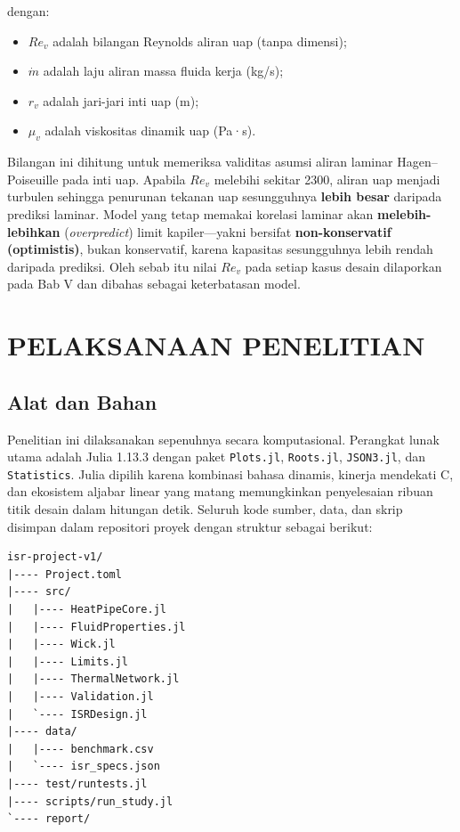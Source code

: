 \documentclass[
  indonesian,
  12pt,
  a4paper,
]{report}
\providecommand{\tightlist}{%
  \setlength{\itemsep}{0pt}\setlength{\parskip}{0pt}}
\begin{document}
dengan:

\begin{itemize}
\tightlist
\item
  \(Re_v\) adalah bilangan Reynolds aliran uap (tanpa dimensi);
\item
  \(\dot{m}\) adalah laju aliran massa fluida kerja (kg/s);
\item
  \(r_v\) adalah jari-jari inti uap (m);
\item
  \(\mu_v\) adalah viskositas dinamik uap (Pa·s).
\end{itemize}

Bilangan ini dihitung untuk memeriksa validitas asumsi aliran laminar
Hagen--Poiseuille pada inti uap. Apabila \(Re_v\) melebihi sekitar 2300,
aliran uap menjadi turbulen sehingga penurunan tekanan uap sesungguhnya
\textbf{lebih besar} daripada prediksi laminar. Model yang tetap memakai
korelasi laminar akan \textbf{melebih-lebihkan} (\emph{overpredict})
limit kapiler---yakni bersifat \textbf{non-konservatif (optimistis)},
bukan konservatif, karena kapasitas sesungguhnya lebih rendah daripada
prediksi. Oleh sebab itu nilai \(Re_v\) pada setiap kasus desain
dilaporkan pada Bab V dan dibahas sebagai keterbatasan model.

\chapter{PELAKSANAAN PENELITIAN}\label{sec-research-methodology}

\section{Alat dan Bahan}\label{alat-dan-bahan}

Penelitian ini dilaksanakan sepenuhnya secara komputasional. Perangkat
lunak utama adalah Julia 1.13.3 dengan paket \texttt{Plots.jl},
\texttt{Roots.jl}, \texttt{JSON3.jl}, dan \texttt{Statistics}. Julia
dipilih karena kombinasi bahasa dinamis, kinerja mendekati C, dan
ekosistem aljabar linear yang matang memungkinkan penyelesaian ribuan
titik desain dalam hitungan detik. Seluruh kode sumber, data, dan skrip
disimpan dalam repositori proyek dengan struktur sebagai berikut:

\begin{verbatim}
isr-project-v1/
|---- Project.toml
|---- src/
|   |---- HeatPipeCore.jl
|   |---- FluidProperties.jl
|   |---- Wick.jl
|   |---- Limits.jl
|   |---- ThermalNetwork.jl
|   |---- Validation.jl
|   `---- ISRDesign.jl
|---- data/
|   |---- benchmark.csv
|   `---- isr_specs.json
|---- test/runtests.jl
|---- scripts/run_study.jl
`---- report/
\end{verbatim}
\end{document}
